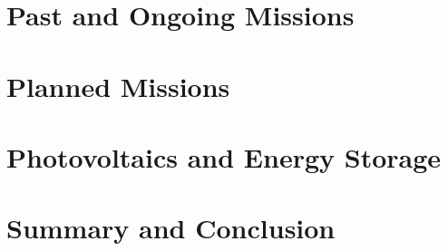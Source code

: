 
\section{Past and Ongoing Missions}
\label{sec:StateOfTheArt:PastAndOngoingMissions}


\clearpage
\section{Planned Missions}
\label{sec:StateOfTheArt:PlannedMissions}


\section{Photovoltaics and Energy Storage}
\label{sec:StateOfTheArt:PhotovoltaicsAndEnergyStorage}


\section{Summary and Conclusion}
\label{sec:StateOfTheArt:SummaryAndConclusion}
